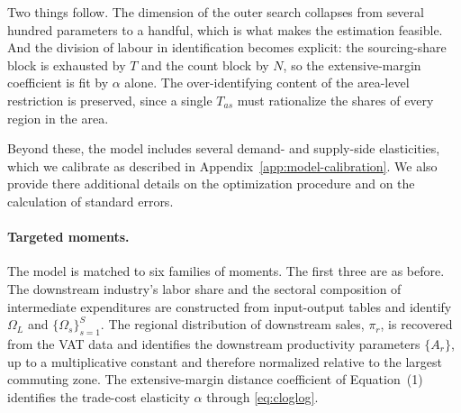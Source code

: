 Two things follow. The dimension of the outer search collapses from several hundred parameters
to a handful, which is what makes the estimation feasible. And the division of labour in
identification becomes explicit: the sourcing-share block is exhausted by $T$ and the count
block by $N$, so the extensive-margin coefficient is fit by $\alpha$ alone. The over-identifying
content of the area-level restriction is preserved, since a single $T_{as}$ must rationalize the
shares of every region in the area.

Beyond these, the model includes several demand- and supply-side elasticities, which we
calibrate as described in Appendix~\ref{app:model-calibration}. We also provide there
additional details on the optimization procedure and on the calculation of standard errors.

\paragraph{Targeted moments.} The model is matched to six families of moments. The first three
are as before. The downstream industry's labor share and the sectoral composition of
intermediate expenditures are constructed from input-output tables and identify $\Omega_{L}$
and $\{\Omega_{s}\}_{s=1}^{S}$. The regional distribution of downstream sales, $\pi_{r}$, is
recovered from the VAT data and identifies the downstream productivity parameters $\{A_{r}\}$,
up to a multiplicative constant and therefore normalized relative to the largest commuting
zone. The extensive-margin distance coefficient of Equation~(1) identifies the trade-cost
elasticity $\alpha$ through \eqref{eq:cloglog}.

